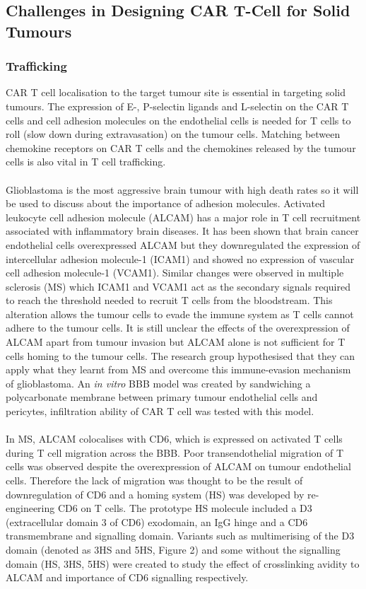 \documentclass[12pt,oneside]{report}
\begin{document}
\subsection{Challenges in Designing CAR T-Cell for Solid Tumours}
\subsubsection{Trafficking} 
CAR T cell localisation to the target tumour site is essential in targeting solid tumours. The expression of E-, P-selectin ligands and L-selectin on the CAR T cells and cell adhesion molecules on the endothelial cells is needed for T cells to roll (slow down during extravasation) on the tumour cells\citep{traffick-2}. Matching between chemokine receptors on CAR T cells and the chemokines released by the tumour cells is also vital in T cell trafficking\citep{traffick-1}. 
\\\\Glioblastoma is the most aggressive brain tumour with high death rates so it will be used to discuss about the importance of adhesion molecules. Activated leukocyte cell adhesion molecule (ALCAM) has a major role in T cell recruitment associated with inflammatory brain diseases\citep{homing}. It has been shown that brain cancer endothelial cells overexpressed ALCAM but they downregulated the expression of intercellular adhesion molecule-1 (ICAM1) and showed no expression of vascular cell adhesion molecule-1 (VCAM1)\citep{homing}. Similar changes were observed in multiple sclerosis (MS) which ICAM1 and VCAM1 act as the secondary signals required to reach the threshold needed to recruit T cells from the bloodstream\citep{MS}. This alteration allows the tumour cells to evade the immune system as T cells cannot adhere to the tumour cells. It is still unclear the effects of the overexpression of ALCAM apart from tumour invasion but ALCAM alone is not sufficient for T cells homing to the tumour cells\citep{homing}. The research group hypothesised that they can apply what they learnt from MS and overcome this immune-evasion mechanism of glioblastoma. An \textit{in vitro} BBB model was created by sandwiching a polycarbonate membrane between primary tumour endothelial cells and pericytes, infiltration ability of CAR T cell was tested with this model.
\\\\In MS, ALCAM colocalises with CD6, which is expressed on activated T cells during T cell migration across the BBB. Poor transendothelial migration of T cells was observed despite the overexpression of ALCAM on tumour endothelial cells\citep{homing}. Therefore the lack of migration was thought to be the result of downregulation of CD6 and a homing system (HS) was developed by re-engineering CD6 on T cells. The prototype HS molecule included a D3 (extracellular domain 3 of CD6) exodomain, an IgG hinge and a CD6 transmembrane and signalling domain. Variants such as multimerising of the D3 domain (denoted as 3HS and 5HS, Figure 2) and some without the signalling domain (HS\textDelta, 3HS\textDelta, 5HS\textDelta) were created to study the effect of crosslinking avidity to ALCAM and importance of CD6 signalling respectively. 
\end{document}
